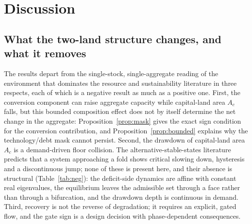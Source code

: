 \section{Discussion}\label{sec:discussion}

\subsection{What the two-land structure changes, and what it removes}

The results depart from the single-stock, single-aggregate reading of the environment that dominates the resource and sustainability literature \citep{Schaefer1954,May1973,Meadows1972,Meadows2004,WackernagelRees1996,BranderTaylor1998} in three respects, each of which is a negative result as much as a positive one. First, the conversion component can raise aggregate capacity while capital-land area $A_c$ falls, but this bounded composition effect does not by itself determine the net change in the aggregate: Proposition~\ref{prop:mask} gives the exact sign condition for the conversion contribution, and Proposition~\ref{prop:bounded} explains why the technology/debt mask cannot persist. Second, the drawdown of capital-land area $A_c$ is a demand-driven floor collision. The alternative-stable-states literature \citep{Scheffer2001} predicts that a system approaching a fold shows critical slowing down, hysteresis and a discontinuous jump; none of these is present here, and their absence is structural (Table~\ref{tab:neg}): the deficit-side dynamics are affine with constant real eigenvalues, the equilibrium leaves the admissible set through a face rather than through a bifurcation, and the drawdown depth is continuous in demand. Third, recovery is not the reverse of degradation; it requires an explicit, gated flow, and the gate sign is a design decision with phase-dependent consequences.

